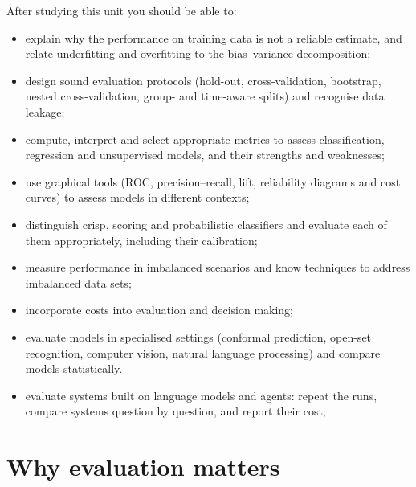 \begin{objectives}
After studying this unit you should be able to:
\begin{itemize}
  \item explain why the performance on training data is not a reliable estimate, and relate
        underfitting and overfitting to the bias--variance decomposition;
  \item design sound evaluation protocols (hold-out, cross-validation, bootstrap, nested
        cross-validation, group- and time-aware splits) and recognise data leakage;
  \item compute, interpret and select appropriate metrics to assess classification, regression and unsupervised
        models, and their strengths and weaknesses;
  \item use graphical tools (ROC, precision--recall, lift, reliability diagrams and cost
        curves) to assess models in different contexts;
  \item distinguish crisp, scoring and probabilistic classifiers and evaluate each of them
        appropriately, including their calibration;
  \item measure performance in imbalanced scenarios and know techniques to address
        imbalanced data sets;
  \item incorporate costs into evaluation and decision making;
  \item evaluate models in specialised settings (conformal prediction, open-set recognition,
        computer vision, natural language processing) and compare models statistically.
\item evaluate systems built on language models and agents: repeat the runs, compare systems question by
question, and report their cost;
\end{itemize}
\end{objectives}

\section{Why evaluation matters}\label{sec:why}

